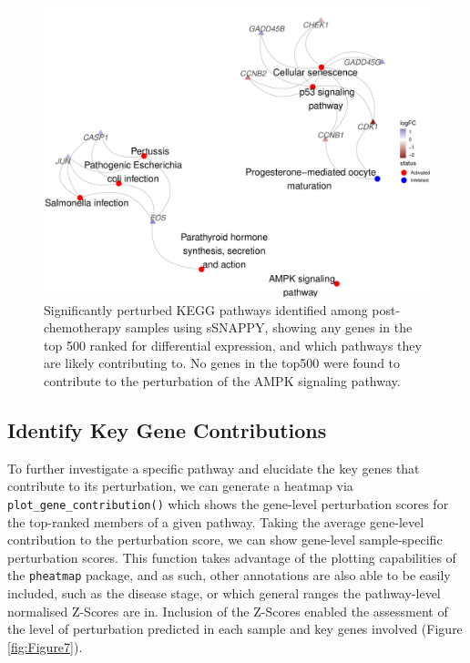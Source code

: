 \documentclass[9pt,a4paper,]{extarticle}
\begin{document}
\begin{figure}

{\centering \includegraphics[width=0.8\linewidth]{sSNAPPY_paper_files/figure-latex/Figure6-1} 

}

\caption{Significantly perturbed KEGG pathways identified among post-chemotherapy samples using sSNAPPY, showing any genes in the top 500 ranked for differential expression, and which pathways they are likely contributing to. No genes in the top500 were found to contribute to the perturbation of the AMPK signaling pathway.}\label{fig:Figure6}
\end{figure}

\hypertarget{identify-key-gene-contributions}{%
\subsection{Identify Key Gene Contributions}\label{identify-key-gene-contributions}}

To further investigate a specific pathway and elucidate the key genes that contribute to its perturbation, we can generate a heatmap via \texttt{plot\_gene\_contribution()} which shows the gene-level perturbation scores for the top-ranked members of a given pathway.
Taking the average gene-level contribution to the perturbation score, we can show gene-level sample-specific perturbation scores.
This function takes advantage of the plotting capabilities of the \texttt{pheatmap} package\citep{pheatmap}, and as such, other annotations are also able to be easily included, such as the disease stage, or which general ranges the pathway-level normalised Z-Scores are in.
Inclusion of the Z-Scores enabled the assessment of the level of perturbation predicted in each sample and key genes involved (Figure \ref{fig:Figure7}).
\end{document}
